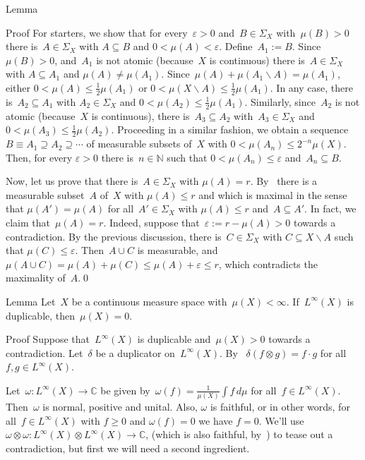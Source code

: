 \documentclass[a]{subfiles}
\begin{document}
\begin{parsec}
\begin{point}{Lemma}
\begin{point}{Proof}
For starters, we show that for every~$\varepsilon >0$
and~$B\in\Sigma_X$ with~$\mu(B)>0$
there is~$A\in\Sigma_X$ with $A\subseteq B$
and  $0<\mu(A)<\varepsilon$.
Define~$A_1 := B$.
Since~$\mu(B)>0$,
and~$A_1$ is not atomic (because~$X$ is continuous)
there is~$A\in\Sigma_X$ with $A\subseteq A_1$ 
and $\mu(A)\neq \mu(A_1)$.
Since~$\mu(A)+\mu(A_1\backslash A)=\mu(A_1)$,
either $0<\mu(A)\leq \frac{1}{2}\mu(A_1)$
or $0<\mu(X\backslash A)\leq \frac{1}{2}\mu(A_1)$.
In any case,
there is~$A_2\subseteq A_1$
with $A_2\in\Sigma_X$
and $0<\mu(A_2)\leq \frac{1}{2}\mu(A_1)$.
Similarly,
since~$A_2$ is not atomic (because~$X$ is continuous),
there is~$A_3\subseteq A_2$
with~$A_3\in\Sigma_X$ and $0<\mu(A_3)\leq \frac{1}{2}\mu(A_2)$.
Proceeding in a similar fashion,
we obtain a sequence $B\equiv A_1 \supseteq A_2\supseteq \dotsb$
of measurable subsets of~$X$
with $0<\mu(A_n)\leq 2^{-n}\mu(X)$.
Then, for every $\varepsilon >0$
there is~$n\in\mathbb{N}$
such that $0<\mu(A_n)\leq \varepsilon$ and~$A_n\subseteq B$.

Now, 
let us prove that there is~$A\in\Sigma_X$ with $\mu(A)=r$.
By~
there is a measurable
subset~$A$ of~$X$
with $\mu(A)\leq r$
and which is maximal
in the sense that $\mu(A')=\mu(A)$
for all~$A'\in\Sigma_X$
with $\mu(A)\leq r$ and~$A\subseteq A'$.
In fact, we claim that~$\mu(A)=r$.
Indeed, suppose that~$\varepsilon := r-\mu(A)>0$
towards a contradiction.
By the previous discussion,
there is~$C\in\Sigma_X$ with $C\subseteq X\backslash A$
such that $\mu(C)\leq \varepsilon$.
Then~$A\cup C$ is measurable,
and $\mu(A\cup C)=\mu(A)+\mu(C)\leq \mu(A)+\varepsilon\leq r$,
which contradicts the maximality of~$A$.\qed
\end{point}
\end{point}
\begin{point}{Lemma}%
Let~$X$ be a continuous measure space
with~$\mu(X)<\infty$.
If~$L^\infty(X)$ is duplicable,
then~$\mu(X)=0$.
\begin{point}{Proof}%
Suppose that~$L^\infty(X)$ is duplicable
and~$\mu(X)>0$
towards a contradiction.
Let~$\delta$
be a duplicator
on~$L^\infty(X)$.
By~
$\delta(f\otimes g)=f\cdot g$ for all~$f,g\in L^\infty(X)$.

Let~$\omega\colon L^\infty(X)\to \mathbb{C}$
be given by~$\omega(f)=\frac{1}{\mu(X)}\int f \,d\mu$
for all~$f\in L^\infty(X)$.
Then~$\omega$ is normal, positive and unital.
Also, $\omega$ is faithful,
or in other words,
for all~$f\in L^\infty(X)$
with $f\geq 0$ and $\omega(f)=0$
we have $f=0$.
We'll use
$\omega\otimes \omega\colon L^\infty(X)\otimes L^\infty(X)\to \mathbb{C}$,
(which is also faithful,
by~)
to tease out a contradiction,
but first we will need a second ingredient.


\end{point}
\end{point}
\end{parsec}
\end{document}
